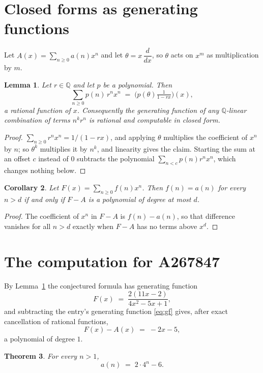 \documentclass[11pt,a4paper]{article}
\theoremstyle{plain}
\newtheorem{theorem}{Theorem}
\newtheorem{lemma}[theorem]{Lemma}
\newtheorem{corollary}[theorem]{Corollary}
\theoremstyle{definition}
\begin{document}
\section{Closed forms as generating functions}

Let $A(x)=\sum_{n\ge 0}a(n)x^{n}$ and let $\theta=x\,\dfrac{d}{dx}$, so $\theta$
acts on $x^{m}$ as multiplication by $m$.

\begin{lemma}\label{lem:gf}
Let $r\in\mathbb{Q}$ and let $p$ be a polynomial. Then
\[
\sum_{n\ge0}p(n)\,r^{n}x^{n}\;=\;\bigl(p(\theta)\tfrac{1}{1-rx}\bigr)(x),
\]
a rational function of $x$. Consequently the generating function of any
$\mathbb{Q}$-linear combination of terms $n^{k}r^{n}$ is rational and computable in
closed form.
\end{lemma}

\begin{proof}
$\sum_{n\ge0}r^{n}x^{n}=1/(1-rx)$, and applying $\theta$ multiplies the coefficient of
$x^{n}$ by $n$; so $\theta^{k}$ multiplies it by $n^{k}$, and linearity gives the claim.
Starting the sum at an offset $c$ instead of $0$ subtracts the polynomial
$\sum_{n<c}p(n)r^{n}x^{n}$, which changes nothing below.
\end{proof}

\begin{corollary}\label{cor:criterion}
Let $F(x)=\sum_{n\ge 0}f(n)x^{n}$. Then $f(n)=a(n)$ for every $n>d$ if and only
if $F-A$ is a polynomial of degree at most $d$.
\end{corollary}

\begin{proof}
The coefficient of $x^{n}$ in $F-A$ is $f(n)-a(n)$, so that difference vanishes for all
$n>d$ exactly when $F-A$ has no terms above $x^{d}$.
\end{proof}

\section{The computation for A267847}

By Lemma~\ref{lem:gf} the conjectured formula has generating function
\[
F(x)\;=\;\frac{2 \left(11 x - 2\right)}{4 x^{2} - 5 x + 1} ,
\]
and subtracting the entry's generating function \eqref{eq:gf} gives, after exact
cancellation of rational functions,
\[
F(x)-A(x)\;=\;- 2 x - 5 ,
\]
a polynomial of degree $1$.

\begin{theorem}
For every $n>1$,
\[
a(n)\;=\;2 \cdot 4^{n} - 6 .
\]
\end{theorem}
\end{document}
